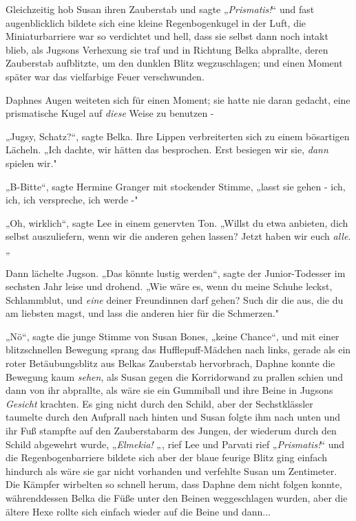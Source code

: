 {Gleichzeitig hob Susan ihren Zauberstab und sagte „\emph{Prismatis!}“ und fast augenblicklich bildete sich eine kleine Regenbogenkugel in der Luft, die Miniaturbarriere war so verdichtet und hell, dass sie selbst dann noch intakt blieb, als Jugsons Verhexung sie traf und in Richtung Belka abprallte, deren Zauberstab aufblitzte, um den dunklen Blitz wegzuschlagen; und einen Moment später war das vielfarbige Feuer verschwunden.

Daphnes Augen weiteten sich für einen Moment; sie hatte nie daran gedacht, eine prismatische Kugel auf \emph{diese} Weise zu benutzen -

„Jugsy, Schatz?“, sagte Belka. Ihre Lippen verbreiterten sich zu einem bösartigen Lächeln. „Ich dachte, wir hätten das besprochen. Erst besiegen wir sie, \emph{dann} spielen wir."

„B-Bitte“, sagte Hermine Granger mit stockender Stimme, „lasst sie gehen - ich, ich, ich verspreche, ich werde -"

„Oh, wirklich“, sagte Lee in einem genervten Ton. „Willst du etwa anbieten, dich selbst auszuliefern, wenn wir die anderen gehen lassen? Jetzt haben wir euch \emph{alle}.„

Dann lächelte Jugson. „Das könnte lustig werden“, sagte der Junior-Todesser im sechsten Jahr leise und drohend. „Wie wäre es, wenn du meine Schuhe leckst, Schlammblut, und \emph{eine} deiner Freundinnen darf gehen? Such dir die aus, die du am liebsten magst, und lass die anderen hier für die Schmerzen."

„Nö“, sagte die junge Stimme von Susan Bones, „keine Chance“, und mit einer blitzschnellen Bewegung sprang das Hufflepuff-Mädchen nach links, gerade als ein roter Betäubungsblitz aus Belkas Zauberstab hervorbrach, Daphne konnte die Bewegung kaum \emph{sehen}, als Susan gegen die Korridorwand zu prallen schien und dann von ihr abprallte, als wäre sie ein Gummiball und ihre Beine in Jugsons \emph{Gesicht} krachten. Es ging nicht durch den Schild, aber der Sechstklässler taumelte durch den Aufprall nach hinten und Susan folgte ihm nach unten und ihr Fuß stampfte auf den Zauberstabarm des Jungen, der wiederum durch den Schild abgewehrt wurde, „\emph{Elmekia!} „, rief Lee und Parvati rief „\emph{Prismatis!}“ und die Regenbogenbarriere bildete sich aber der blaue feurige Blitz ging einfach hindurch als wäre sie gar nicht vorhanden und verfehlte Susan um Zentimeter. Die Kämpfer wirbelten so schnell herum, dass Daphne dem nicht folgen konnte, währenddessen Belka die Füße unter den Beinen weggeschlagen wurden, aber die ältere Hexe rollte sich einfach wieder auf die Beine und dann...

}
